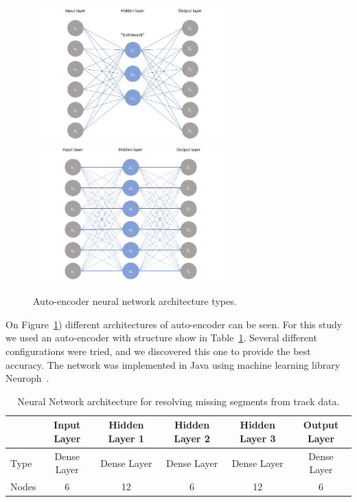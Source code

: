 \documentclass[12pt]{article}
\begin{document}
\begin{figure}[!ht]
\begin{center}
 \includegraphics[width=3.0in]{images/ae_nb.png}
 \includegraphics[width=3.0in]{images/ae_b.png}
\caption {Auto-encoder neural network architecture types.}
 \label{pic:autoencoders}
 \end{center}
\end{figure}

On Figure~\ref{pic:autoencoders}) different architectures of auto-encoder can be seen. For this study we used 
an auto-encoder with structure show in Table~\ref{table:network}. Several different configurations were tried, and
we discovered this one to provide the best accuracy.
The network was implemented in Java using machine learning library Neuroph~\cite{neuroph-2.98}. 

\begin{table}[!h]
\begin{center}
\begin{tabular}{|l|c|c|c|c|c|}
\hline
 & Input Layer & Hidden Layer 1 & Hidden Layer 2 & Hidden Layer 3 & Output Layer \\
\hline
\hline
Type & Dense Layer & Dense Layer &Dense Layer &Dense Layer &Dense Layer \\
\hline
Nodes & 6 & 12 & 6 & 12 & 6 \\
\hline
\end{tabular}
\end{center}
\caption{Neural Network architecture for resolving missing segments from track data.}
\label{table:network}
\end{table}
\end{document}

